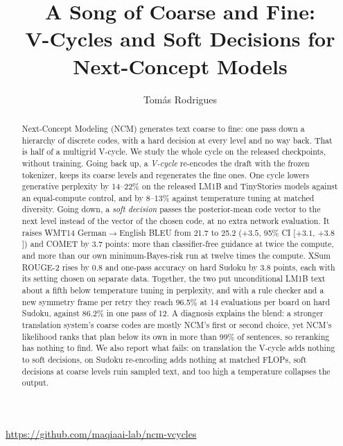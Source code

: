 \documentclass[11pt]{article}
\title{\vspace{-0.5cm}%
  \fontsize{19}{23}\selectfont A Song of Coarse and Fine:\\
  V-Cycles and Soft Decisions for Next-Concept Models}
\author{Tom\'as Rodrigues}
\affil{maqia (\href{https://maqia.ai}{maqia.ai})}
\date{}
\begin{document}
\maketitle

\vspace{-0.89cm}
{\centering\small\href{https://github.com/maqiaai-lab/ncm-vcycles}{\textcolor{black}{\faGithub}}\enspace\url{https://github.com/maqiaai-lab/ncm-vcycles}\par}
\vspace{4pt}

\begin{abstract}
Next-Concept Modeling (NCM) generates text coarse to fine: one pass down a hierarchy of discrete codes, with a hard
decision at every level and no way back. That is half of a multigrid V-cycle. We study the whole cycle on the released
checkpoints, without training. Going back up, a \emph{V-cycle} re-encodes the draft with the frozen tokenizer, keeps
its coarse levels and regenerates the fine ones. One cycle lowers generative perplexity by 14--22\% on the released
LM1B and TinyStories models against an equal-compute control, and by 8--13\% against temperature tuning at matched
diversity. Going down, a \emph{soft decision} passes the posterior-mean code vector to the next level instead of the
vector of the chosen code, at no extra network evaluation. It raises WMT14 German$\to$English BLEU from 21.7 to 25.2
($+3.5$, 95\% CI [$+3.1$, $+3.8$]) and COMET by 3.7 points: more than classifier-free guidance at twice the compute,
and more than our own minimum-Bayes-risk run at twelve times the compute. XSum ROUGE-2 rises by 0.8 and one-pass
accuracy on hard Sudoku by 3.8 points, each with its setting chosen on separate data. Together, the two put
unconditional LM1B text about a fifth below temperature tuning in perplexity, and with a rule checker and a new
symmetry frame per retry they reach 96.5\% at 14 evaluations per board on hard Sudoku, against 86.2\% in one pass of
12. A diagnosis explains the blend: a stronger translation system's coarse codes are mostly NCM's first or second
choice, yet NCM's likelihood ranks that plan below its own in more than 99\% of sentences, so reranking has nothing to
find. We also report what fails: on translation the V-cycle adds nothing to soft decisions, on Sudoku re-encoding
adds nothing at matched FLOPs, soft decisions at coarse levels ruin sampled text, and too high a temperature
collapses the output.
\end{abstract}
\end{document}
